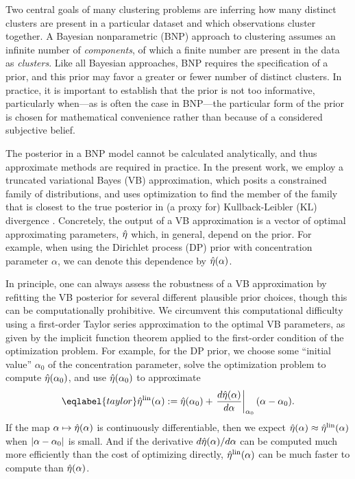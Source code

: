 Two central goals of many clustering problems are inferring how many distinct
clusters are present in a particular dataset and which observations cluster
together. A Bayesian nonparametric (BNP) approach to clustering assumes an
infinite number of \textit{components}, of which a finite number are present in
the data as \textit{clusters}. Like all Bayesian approaches, BNP requires the
specification of a prior, and this prior may favor a greater or fewer number of
distinct clusters. In practice, it is important to establish that the prior is
not too informative, particularly when---as is often the case in BNP---the
particular form of the prior is chosen for mathematical convenience rather than
because of a considered subjective belief.

The posterior in a BNP model cannot be calculated analytically, and thus
approximate methods are required in practice. In the present work, we employ a
truncated variational Bayes (VB) approximation, which posits a constrained
family of distributions, and uses optimization to find the member of the family
that is closest to the true posterior in (a proxy for) Kullback-Leibler
($\mathrm{KL}$) divergence \citep{blei:2017:vi_review, blei:2006:vi_for_dp}.
Concretely, the output of a VB approximation is a vector of optimal
approximating parameters, $\hat\eta$ which, in general, depend on the prior.  For
example, when using the Dirichlet process (DP) prior with concentration
parameter $\alpha$, we can denote this dependence by $\hat\eta(\alpha)$.

In principle, one can always assess the robustness of a VB approximation by
refitting the VB posterior for several different plausible prior choices, though
this can be computationally prohibitive. We circumvent this computational
difficulty using a first-order Taylor series approximation to the optimal VB
parameters, as given by the implicit function theorem applied to the first-order
condition of the optimization problem. For example, for the DP prior, we choose
some ``initial value'' $\alpha_0$ of the concentration parameter, solve the
optimization problem to compute $\hat\eta(\alpha_0)$, and use $\hat\eta(\alpha_0)$
to approximate
%
\begin{align}\eqlabel{taylor}
%
\etalin(\alpha) :=
    \etaopt(\alpha_0) +
    \fracat{d\etaopt(\alpha)}{d\alpha}{\alpha_0} (\alpha - \alpha_0).
%
\end{align}
%
If the map $\alpha \mapsto \hat\eta(\alpha)$ is continuously differentiable, then
we expect $\hat\eta(\alpha) \approx \hat\eta^{\mathrm{lin}}(\alpha)$ when $\left|\alpha -
\alpha_0\right|$ is small.  And if the derivative $d\hat\eta(\alpha) / d\alpha$ can be
computed much more efficiently than the cost of optimizing directly,
$\hat\eta^{\mathrm{lin}}(\alpha)$ can be much faster to compute than $\hat\eta(\alpha)$.

